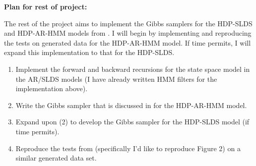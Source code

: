 \documentclass[twoside]{article}
\begin{document}
\textbf{Plan for rest of project:}

The rest of the project aims to implement the Gibbs samplers for the HDP-SLDS and HDP-AR-HMM models from \cite{fox2011bayesian}. I will begin by implementing and reproducing the tests on generated data for the HDP-AR-HMM model. If time permits, I will expand this implementation to that for the HDP-SLDS.
\begin{enumerate}
  \item Implement the forward and backward recursions for the state space model in the AR/SLDS models (I have already written HMM filters for the implementation above).
  \item Write the Gibbs sampler that is discussed in \cite{fox2011bayesian} for the HDP-AR-HMM model.
  \item Expand upon (2) to develop the Gibbs sampler for the HDP-SLDS model (if time permits).
  \item Reproduce the tests from \cite{fox2011bayesian} (specifically I'd like to reproduce Figure 2) on a similar generated data set.
\end{enumerate}

\newpage


\end{document}
